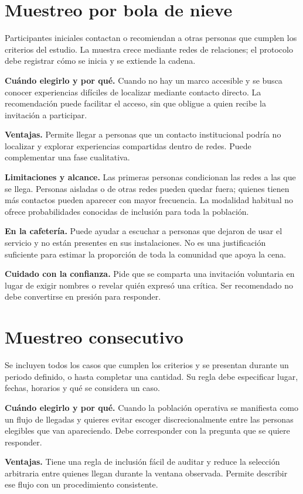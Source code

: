 \documentclass[11pt,letterpaper]{article}
\begin{document}
\section{Muestreo por bola de nieve}
Participantes iniciales contactan o recomiendan a otras personas que cumplen los criterios del estudio. La muestra crece mediante redes de relaciones; el protocolo debe registrar cómo se inicia y se extiende la cadena.

\textbf{Cuándo elegirlo y por qué.} Cuando no hay un marco accesible y se busca conocer experiencias difíciles de localizar mediante contacto directo. La recomendación puede facilitar el acceso, sin que obligue a quien recibe la invitación a participar.

\textbf{Ventajas.} Permite llegar a personas que un contacto institucional podría no localizar y explorar experiencias compartidas dentro de redes. Puede complementar una fase cualitativa.

\textbf{Limitaciones y alcance.} Las primeras personas condicionan las redes a las que se llega. Personas aisladas o de otras redes pueden quedar fuera; quienes tienen más contactos pueden aparecer con mayor frecuencia. La modalidad habitual no ofrece probabilidades conocidas de inclusión para toda la población.

\textbf{En la cafetería.} Puede ayudar a escuchar a personas que dejaron de usar el servicio y no están presentes en sus instalaciones. No es una justificación suficiente para estimar la proporción de toda la comunidad que apoya la cena.

\textbf{Cuidado con la confianza.} Pide que se comparta una invitación voluntaria en lugar de exigir nombres o revelar quién expresó una crítica. Ser recomendado no debe convertirse en presión para responder.
\section{Muestreo consecutivo}
Se incluyen todos los casos que cumplen los criterios y se presentan durante un periodo definido, o hasta completar una cantidad. Su regla debe especificar lugar, fechas, horarios y qué se considera un caso.

\textbf{Cuándo elegirlo y por qué.} Cuando la población operativa se manifiesta como un flujo de llegadas y quieres evitar escoger discrecionalmente entre las personas elegibles que van apareciendo. Debe corresponder con la pregunta que se quiere responder.

\textbf{Ventajas.} Tiene una regla de inclusión fácil de auditar y reduce la selección arbitraria entre quienes llegan durante la ventana observada. Permite describir ese flujo con un procedimiento consistente.
\end{document}
